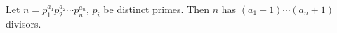 Let $n = p_1^{a_1}p_2^{a_2}\cdots p_n^{a_n}$, $p_i$ be distinct primes. Then $n$ has $(a_1 + 1)\cdots(a_n + 1)$ divisors.
